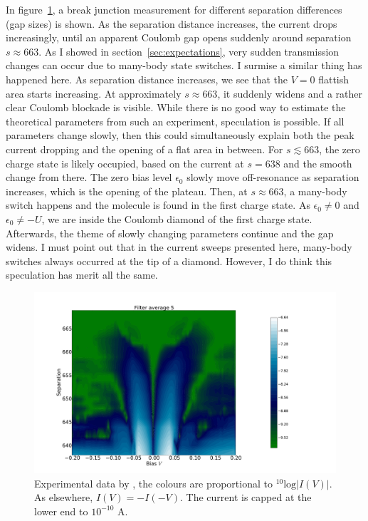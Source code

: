In figure~\ref{fig:perrindata}, a break junction measurement for different separation differences (gap sizes) is shown. As the separation distance increases, the current drops increasingly, until an apparent Coulomb gap opens suddenly around separation $s \approx 663$. As I showed in section~\ref{sec:expectations}, very sudden transmission changes can occur due to many-body state switches. I surmise a similar thing has happened here. As separation distance increases, we see that the $V=0$ flattish area starts increasing. At approximately $s\approx 663$, it suddenly widens and a rather clear Coulomb blockade is visible. While there is no good way to estimate the theoretical parameters from such an experiment, speculation is possible. If all parameters change slowly, then this could simultaneously explain both the peak current dropping and the opening of a flat area in between. For $s \lesssim 663$, the zero charge state is likely occupied, based on the current at $s = 638$ and the smooth change from there. The zero bias level $\epsilon_0$ slowly move off-resonance as separation increases, which is the opening of the plateau. Then, at $s \approx 663$, a many-body switch happens and the molecule is found in the first charge state. As $\epsilon_0 \neq 0 $ and $\epsilon_0 \neq -U$, we are inside the Coulomb diamond of the first charge state. Afterwards, the theme of slowly changing parameters continue and the gap widens. I must point out that in the current sweeps presented here, many-body switches always occurred at the tip of a diamond. However, I do think this speculation has merit all the same.
\begin{figure}[htb]
    \centering
    \includegraphics[width=.99\textwidth,clip=true, trim=4cm 0cm 10cm 4cm]{pdf/perrin_experiment_abs.pdf}
    \caption{Experimental data by \citet{perrinnano}, the colours are proportional to $^{10}\text{log}\left|I(V)\right|$. As elsewhere, $I(V) = -I(-V)$. The current is capped at the lower end to $10^{-10}$ A.}
    \label{fig:perrindata}
\end{figure}

